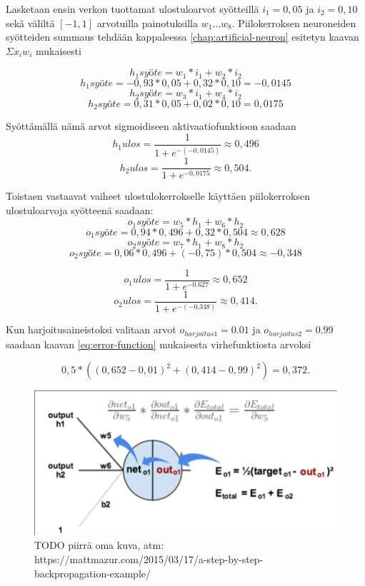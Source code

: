 \documentclass[finnish]{tktltiki2}
\theoremstyle{definition}
\theoremstyle{remark}
\begin{document}
  Lasketaan ensin verkon tuottamat ulostuloarvot syötteillä $i_1 = 0,05$ ja $i_2 = 0,10$ sekä väliltä $[-1, 1]$ arvotuilla painotuksilla $w_1...w_8$. Piilokerroksen neuroneiden syötteiden summaus tehdään kappaleessa \ref{chap:artificial-neuron} esitetyn kaavan $\Sigma x_i w_i$ mukaisesti
  
  $$h_{1}syöte = w_1 * i_1 + w_2 * i_2$$
  $$h_{1}syöte = -0,93 * 0,05 + 0,32 * 0,10 = -0,0145$$
  $$h_{2}syöte = w_3 * i_1 + w_4 * i_2$$
  $$h_{2}syöte = 0,31 * 0,05 + 0,02 * 0,10 = 0,0175$$

  Syöttämällä nämä arvot sigmoidiseen aktivaatiofunktioon saadaan
  $$h_{1}ulos = \frac{1}{1 + e^{-(-0,0145)}} \approx 0,496$$
  $$h_{2}ulos = \frac{1}{1 + e^{-0,0175}} \approx 0,504.$$

  Toistaen vastaavat vaiheet ulostulokerrokselle käyttäen piilokerroksen ulostuloarvoja syötteenä saadaan:
  $$o_{1}syöte = w_5 * h_1 + w_6 * h_2$$
  $$o_{1}syöte = 0,94 * 0,496 + 0,32 * 0,504 \approx 0,628$$
  $$o_{2}syöte = w_7 * h_1 + w_8 * h_2$$
  $$o_{2}syöte = 0,06 * 0,496 + (-0,75) * 0,504 \approx -0,348$$

  $$o_{1}ulos = \frac{1}{1 + e^{-0.627}} \approx 0,652$$
  $$o_{2}ulos = \frac{1}{1 + e^{-(-0.348)}} \approx 0,414.$$

  Kun harjoitusaineistoksi valitaan arvot $o_{harjoitus1} = 0.01$ ja $o_{harjoitus2} = 0.99$ saadaan kaavan \ref{eq:error-function} mukaisesta virhefunktiosta arvoksi

  $$ 0,5 * ( (0,652 - 0,01)^2 + (0,414 - 0,99)^2 ) = 0,372. $$
  
    \begin{figure}[h]
    \centering
    \includegraphics[scale=0.4]{chain-rule}
    \caption{TODO piirrä oma kuva, atm: https://mattmazur.com/2015/03/17/a-step-by-step-backpropagation-example/}
    \label{pic:chain-rule}
    \end{figure}
\end{document}

